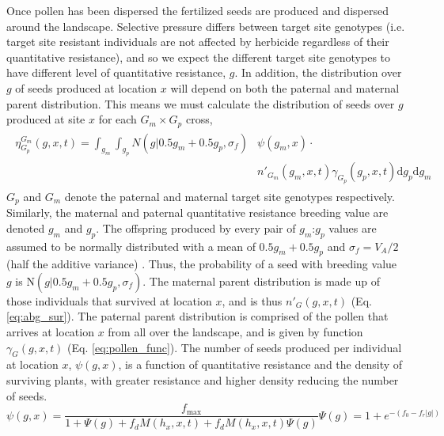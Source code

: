 \documentclass[10pt,letterpaper]{article}
\begin{document}
Once pollen has been dispersed the fertilized seeds are produced and dispersed around the landscape. Selective pressure differs between target site genotypes (i.e. target site resistant individuals are not affected by herbicide regardless of their quantitative resistance), and so we expect the different target site genotypes to have different level of quantitative resistance, $g$. In addition, the distribution over $g$ of seeds produced at location $x$ will depend on both the paternal and maternal parent distribution. This means we must calculate the distribution of seeds over $g$ produced at site $x$ for each $G_m \times G_p$ cross, 
\begin{align}
\label{eq:fec_GG}
\begin{split}
	\eta_{G_p}^{G_m}(g, x, t) = \int_{g_m}\int_{g_p} N(g|0.5 g_m + 0.5 g_p, \sigma_f)&\psi(g_m, x)\cdot\\
	&n'_{G_m}(g_m, x, t)\gamma_{G_p}(g_p, x, t)\text{d}g_p\text{d}g_m
\end{split}
\end{align}          
$G_p$ and $G_m$ denote the paternal and maternal target site genotypes respectively. Similarly, the maternal and paternal quantitative resistance breeding value are denoted $g_m$ and $g_p$. The offspring produced by every pair of $g_m$:$g_p$ values are assumed to be normally distributed with a mean of $0.5g_m + 0.5g_p$ and $\sigma_f = V_A/2$ (half the additive variance) \cite{Ture1994}. Thus, the probability of a seed with breeding value $g$ is $\text{N}(g|0.5 g_m + 0.5 g_p, \sigma_f)$. The maternal parent distribution is made up of those individuals that survived at location $x$, and is thus $n'_{G}(g, x, t)$ (Eq. \ref{eq:abg_sur}). The paternal parent distribution is comprised of the pollen that arrives at location $x$ from all over the landscape, and is given by function $\gamma_{G}(g, x, t)$ (Eq. \ref{eq:pollen_func}). The number of seeds produced per individual at location $x$, $\psi(g, x)$, is a function of quantitative resistance and the density of surviving plants, with greater resistance and higher density reducing the number of seeds. 
\begin{subequations}
\begin{equation}\label{eq:seed_production}
	\psi(g, x) = \frac{f_\text{max}}{1 + \Psi(g) + f_d M(h_x, x, t) + f_dM(h_x, x, t) \Psi(g)}
\end{equation}  
\begin{equation}
	\Psi(g) = 1 + e^{-(f_0 - f_r|g|)}
\end{equation}
\end{subequations}
\end{document}
